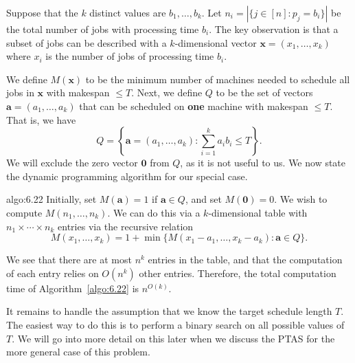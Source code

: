 Suppose that the $k$ distinct values are $b_1, \dots, b_k$. Let $n_i = 
|\{j \in [n] : p_j = b_i\}|$ be the total number of jobs with processing 
time $b_i$. The key observation is that a subset of jobs can be described with a 
$k$-dimensional vector $\mathbf x = (x_1, \dots, x_k)$ where $x_i$ is the number 
of jobs of processing time $b_i$. 

We define $M(\mathbf x)$ to be the minimum number of machines needed 
to schedule all jobs in $\mathbf x$ with makespan $\leq T$. Next, we define 
$Q$ to be the set of vectors $\mathbf a = (a_1, \dots, a_k)$ that can be 
scheduled on {\bf one} machine with makespan $\leq T$. That is, we have 
\[ Q = \left\{ \mathbf a = (a_1, \dots, a_k) : \sum_{i=1}^k a_i b_i \leq T \right\}. \] 
We will exclude the zero vector $\mathbf 0$ from $Q$, as it is not useful to us.
We now state the dynamic programming algorithm for our special case.  

\begin{algo}{algo:6.22}
    Initially, set $M(\mathbf a) = 1$ if $\mathbf a \in Q$, and 
    set $M(\mathbf 0) = 0$. We wish to compute $M(n_1, \dots, n_k)$. 
    We can do this via a $k$-dimensional table with $n_1 \times \cdots \times 
    n_k$ entries via the recursive relation 
    \[ M(x_1, \dots, x_k) = 1 + \min\{M(x_1 - a_1, \dots, x_k - a_k) : 
    \mathbf a \in Q\}. \]  
\end{algo}

We see that there are at most $n^k$ entries in the table, and that the 
computation of each entry relies on $O(n^k)$ other entries. Therefore, 
the total computation time of Algorithm~\ref{algo:6.22} is $n^{O(k)}$. 

It remains to handle the assumption that we know the target schedule length $T$. 
The easiest way to do this is to perform a binary search on all possible values 
of $T$. We will go into more detail on this later when we discuss the PTAS 
for the more general case of this problem. 

